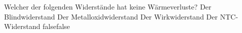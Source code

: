     {Welcher der folgenden Widerstände hat keine Wärmeverluste?}
    {Der Blindwiderstand}
    {Der Metalloxidwiderstand}
    {Der Wirkwiderstand}
    {Der NTC-Widerstand}
    {false}{false}